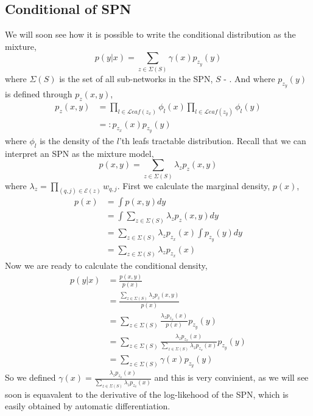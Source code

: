 \subsection{Conditional of SPN}

We will soon see how it is possible to write the conditional distribution as the mixture, 
$$p(y|x) = \sum_{z \in \Sigma(S)} \gamma(x) p_{z_y}(y)$$
where $ \Sigma(S)$ is the set of all sub-networks in the SPN, $S$ - .  
And where $p_{z_y}(y)$ is defined through $p_z(x,y)$, 
\begin{align*}
    p_z(x,y) &= \prod_{l \in \mathcal{L}eaf(z_x)} \phi_l(x)\prod_{l \in \mathcal{L}eaf(z_y)} \phi_l(y)\\
            &=: p_{z_x}(x) p_{z_y}(y) 
\end{align*}
where $\phi_l$ is the density of the $l$'th leafs tractable distribution. Recall that we can interpret an SPN
as the mixture model, 
$$p(x,y) = \sum_{z \in \Sigma(S)} \lambda_z p_z(x,y)$$
where $\lambda_z = \prod_{(q,j) \in \mathcal{E}(z)} w_{q,j}$. First we calculate the marginal density,
$p(x)$, 
\begin{align*}
    p(x) &= \int p(x,y)dy\\
    &= \int \sum_{z \in \Sigma(S)} \lambda_z p_z(x,y)dy\\
    &= \sum_{z \in \Sigma(S)} \lambda_z p_{z_x}(x)\int p_{z_y}(y)dy \\
    &= \sum_{z \in \Sigma(S)} \lambda_z p_{z_x}(x)
\end{align*}
Now we are ready to calculate the conditional density, 
\begin{align*}
    p(y|x) &=  \frac{p(x,y)}{p(x)}\\
            &= \frac{\sum_{z \in \Sigma(S)} \lambda_z p_z(x,y)}{p(x)}\\
            &=\sum_{z \in \Sigma(S)}\frac{ \lambda_z p_{z_x}(x)}{p(x)} p_{z_y}(y)\\
            &=\sum_{z \in \Sigma(S)}\frac{ \lambda_z p_{z_x}(x)}{\sum_{z \in \Sigma(S)} \lambda_z p_{z_x}(x)} p_{z_y}(y)\\
            &=\sum_{z \in \Sigma(S)} \gamma(x) p_{z_y}(y)
\end{align*}
So we defined $\gamma(x) = \frac{ \lambda_z p_{z_x}(x)}{\sum_{z \in \Sigma(S)} \lambda_z p_{z_x}(x)}$ 
and this is very convinient, as we will see soon is 
equavalent to the derivative of the log-likehood
of the SPN, which is easily obtained by automatic differentiation. 

